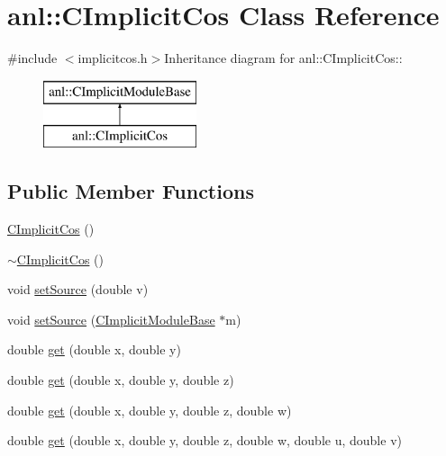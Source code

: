 \hypertarget{classanl_1_1CImplicitCos}{
\section{anl::CImplicitCos Class Reference}
\label{classanl_1_1CImplicitCos}
}


{\ttfamily \#include $<$implicitcos.h$>$}Inheritance diagram for anl::CImplicitCos::\begin{figure}[H]
\begin{center}
\leavevmode
\includegraphics[height=2cm]{classanl_1_1CImplicitCos}
\end{center}
\end{figure}
\subsection*{Public Member Functions}
\begin{DoxyCompactItemize}
\item 
\hyperlink{classanl_1_1CImplicitCos_a0e74b5729f3c7b99fbd322f67a578d33}{CImplicitCos} ()
\item 
\hyperlink{classanl_1_1CImplicitCos_a58c95d971d6b156b30739a382d213a05}{$\sim$CImplicitCos} ()
\item 
void \hyperlink{classanl_1_1CImplicitCos_ad1ead16f74e1d5d914d09a09ee6a70b1}{setSource} (double v)
\item 
void \hyperlink{classanl_1_1CImplicitCos_a18391bf191ac76b44dfdb0850b95d764}{setSource} (\hyperlink{classanl_1_1CImplicitModuleBase}{CImplicitModuleBase} $\ast$m)
\item 
double \hyperlink{classanl_1_1CImplicitCos_ad17b40e7a1bfee39e5c0bd103154cc22}{get} (double x, double y)
\item 
double \hyperlink{classanl_1_1CImplicitCos_a4b8b0150cfffc6e066fc4e62cb2dd33e}{get} (double x, double y, double z)
\item 
double \hyperlink{classanl_1_1CImplicitCos_aa9326ba121ca49ae6caf52e7143020a7}{get} (double x, double y, double z, double w)
\item 
double \hyperlink{classanl_1_1CImplicitCos_ad96831fb125b4c63bd17cd5f8064a64f}{get} (double x, double y, double z, double w, double u, double v)
\end{DoxyCompactItemize}
